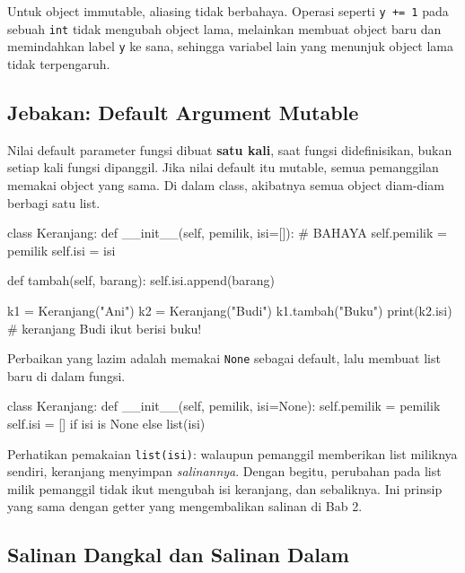 Untuk object immutable, aliasing tidak berbahaya. Operasi seperti \texttt{y += 1} pada sebuah \texttt{int} tidak mengubah object lama, melainkan membuat object baru dan memindahkan label \texttt{y} ke sana, sehingga variabel lain yang menunjuk object lama tidak terpengaruh.

\subsection{Jebakan: Default Argument Mutable}

Nilai default parameter fungsi dibuat \textbf{satu kali}, saat fungsi didefinisikan, bukan setiap kali fungsi dipanggil. Jika nilai default itu mutable, semua pemanggilan memakai object yang sama. Di dalam class, akibatnya semua object diam-diam berbagi satu list.

\begin{kode}
class Keranjang:
    def __init__(self, pemilik, isi=[]):     # BAHAYA
        self.pemilik = pemilik
        self.isi = isi

    def tambah(self, barang):
        self.isi.append(barang)

k1 = Keranjang("Ani")
k2 = Keranjang("Budi")
k1.tambah("Buku")
print(k2.isi)            # keranjang Budi ikut berisi buku!
\end{kode}

\begin{keluaran}
['Buku']
\end{keluaran}

Perbaikan yang lazim adalah memakai \texttt{None} sebagai default, lalu membuat list baru di dalam fungsi.

\begin{kode}[Perbaikan]
class Keranjang:
    def __init__(self, pemilik, isi=None):
        self.pemilik = pemilik
        self.isi = [] if isi is None else list(isi)
\end{kode}

Perhatikan pemakaian \texttt{list(isi)}: walaupun pemanggil memberikan list miliknya sendiri, keranjang menyimpan \emph{salinannya}. Dengan begitu, perubahan pada list milik pemanggil tidak ikut mengubah isi keranjang, dan sebaliknya. Ini prinsip yang sama dengan getter yang mengembalikan salinan di Bab 2.

\subsection{Salinan Dangkal dan Salinan Dalam}

